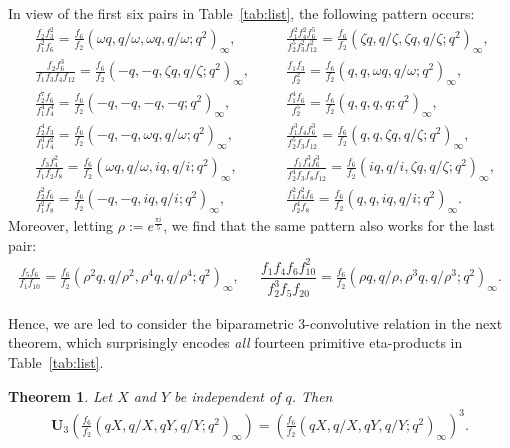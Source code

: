 \documentclass[12pt,reqno]{amsart}
\numberwithin{equation}{section}
\theoremstyle{plain}
\newtheorem{theorem}{Theorem}[section]
\theoremstyle{definition}
\theoremstyle{named}
\newcommand{\UU}{\mathbf{U}}
\begin{document}
In view of the first six pairs in Table~\ref{tab:list}, the following pattern occurs:
\begin{align*}
	&\frac{f_2f_3^2}{f_1^2f_6} = \frac{f_6}{f_2}(\omega q, q/\omega,\omega q, q/\omega;q^2)_\infty, \quad && \frac{f_1^2f_4^2f_6^5}{f_2^5f_3^2f_{12}^2} = \frac{f_6}{f_2}(\zeta q, q/\zeta,\zeta q, q/\zeta;q^2)_\infty,\\
	&\frac{f_2f_6^3}{f_1f_3f_4f_{12}} = \frac{f_6}{f_2}(-q, -q,\zeta q, q/\zeta;q^2)_\infty, \quad && \frac{f_1 f_3 }{ f_2^2} = \frac{f_6}{f_2}(q,q,\omega q, q/\omega;q^2)_\infty,\\
	&\frac{f_2^7 f_6 }{ f_1^4 f_4^4} = \frac{f_6}{f_2}(-q,-q,-q,-q;q^2)_\infty, \quad && \frac{f_1^4 f_6 }{ f_2^5} = \frac{f_6}{f_2}(q,q,q,q;q^2)_\infty,\\
	&\frac{f_2^4 f_3 }{ f_1^3 f_4^2} = \frac{f_6}{f_2}(-q,-q,\omega q, q/\omega;q^2)_\infty, \quad && \frac{f_1^3 f_4 f_6^3 }{ f_2^5 f_3 f_{12}} = \frac{f_6}{f_2}(q,q,\zeta q, q/\zeta;q^2)_\infty,\\
	&\frac{f_3 f_4^2 }{ f_1 f_2 f_8} = \frac{f_6}{f_2}(\omega q, q/\omega,i q, q/i;q^2)_\infty, \quad && \frac{f_1 f_4^3 f_6^3 }{ f_2^4 f_3 f_8 f_{12}} = \frac{f_6}{f_2}(i q, q/i,\zeta q, q/\zeta;q^2)_\infty,\\
	&\frac{f_2^2 f_6 }{ f_1^2 f_8} = \frac{f_6}{f_2}(-q,-q,i q, q/i;q^2)_\infty, \quad && \frac{f_1^2 f_4^2 f_6 }{ f_2^4 f_8} = \frac{f_6}{f_2}(q,q,i q, q/i;q^2)_\infty.
\end{align*}
Moreover, letting $\rho:=e^{\frac{\pi i}{5}}$, we find that the same pattern also works for the last pair:
\begin{align*}
    \frac{f_5 f_6 }{ f_1 f_{10}} = \frac{f_6}{f_2}(\rho^2 q, q/\rho^2,\rho^4 q, q/\rho^4;q^2)_\infty, \ \quad\  \dfrac{f_1 f_4 f_6 f_{10}^2 }{ f_2^3 f_5 f_{20}} = \frac{f_6}{f_2}(\rho q, q/\rho,\rho^3 q, q/\rho^3;q^2)_\infty.
\end{align*}

Hence, we are led to consider the biparametric $3$-convolutive relation in the next theorem, which surprisingly encodes \emph{all} fourteen primitive eta-products in Table~\ref{tab:list}.

\begin{theorem}\label{th:para-3-conv}
	Let $X$ and $Y$ be independent of $q$. Then
	\begin{align}\label{eq:para-3-conv}
		\UU_3\left(\frac{f_6}{f_2} (qX,q/X,qY,q/Y;q^2)_\infty\right) = \left(\frac{f_6}{f_2} (qX,q/X,qY,q/Y;q^2)_\infty\right)^3.
	\end{align}
\end{theorem}
\end{document}

